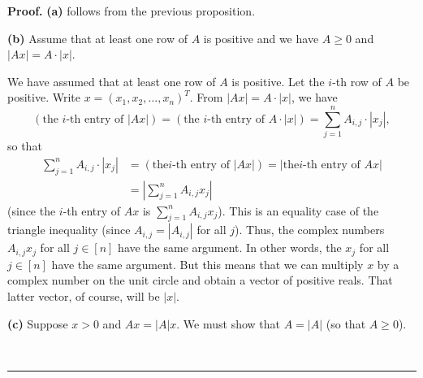 \documentclass[numbers=enddot,12pt,final,onecolumn,notitlepage]{scrartcl}%
\numberwithin{exer}{subsection}
\theoremstyle{definition}
\newenvironment{proof}[1][Proof]{\noindent\textbf{#1.} }{\ \rule{0.5em}{0.5em}}
\let\sumnonlimits\sum
\renewcommand{\sum}{\sumnonlimits\limits}
\begin{document}
\begin{proof}
\textbf{(a)} follows from the previous proposition.

\textbf{(b)} Assume that at least one row of $A$ is positive and we have
$A\geq0$ and $\left\vert Ax\right\vert =A\cdot\left\vert x\right\vert $.

We have assumed that at least one row of $A$ is positive. Let the $i$-th row
of $A$ be positive. Write $x=\left(  x_{1},x_{2},\ldots,x_{n}\right)  ^{T}$.
From $\left\vert Ax\right\vert =A\cdot\left\vert x\right\vert $, we have%
\[
\left(  \text{the }i\text{-th entry of }\left\vert Ax\right\vert \right)
=\left(  \text{the }i\text{-th entry of }A\cdot\left\vert x\right\vert
\right)  =\sum_{j=1}^{n}A_{i,j}\cdot\left\vert x_{j}\right\vert ,
\]
so that
\begin{align*}
\sum_{j=1}^{n}A_{i,j}\cdot\left\vert x_{j}\right\vert  & =\left(  \text{the
}i\text{-th entry of }\left\vert Ax\right\vert \right)  =\left\vert \text{the
}i\text{-th entry of }Ax\right\vert \\
& =\left\vert \sum_{j=1}^{n}A_{i,j}x_{j}\right\vert
\end{align*}
(since the $i$-th entry of $Ax$ is $\sum_{j=1}^{n}A_{i,j}x_{j}$). This is an
equality case of the triangle inequality (since $A_{i,j}=\left\vert
A_{i,j}\right\vert $ for all $j$). Thus, the complex numbers $A_{i,j}x_{j}$
for all $j\in\left[  n\right]  $ have the same argument. In other words, the
$x_{j}$ for all $j\in\left[  n\right]  $ have the same argument. But this
means that we can multiply $x$ by a complex number on the unit circle and
obtain a vector of positive reals. That latter vector, of course, will be
$\left\vert x\right\vert $.

\textbf{(c)} Suppose $x>0$ and $Ax=\left\vert A\right\vert x$. We must show
that $A=\left\vert A\right\vert $ (so that $A\geq0$).


\end{proof}
\end{document}
